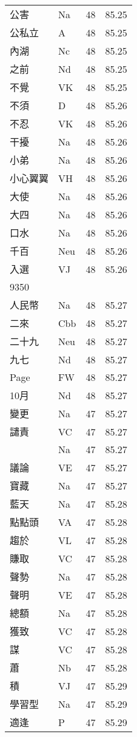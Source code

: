 \documentclass[twocolumn]{book}
\begin{document}
\begin{supertabular}{llrr}
公害 & Na & 48 &  85.25\\
公私立 & A & 48 &  85.25\\
內湖 & Nc & 48 &  85.25\\
之前 & Nd & 48 &  85.25\\
不覺 & VK & 48 &  85.25\\
不須 & D & 48 &  85.26\\
不忍 & VK & 48 &  85.26\\
干擾 & Na & 48 &  85.26\\
小弟 & Na & 48 &  85.26\\
小心翼翼 & VH & 48 &  85.26\\
大使 & Na & 48 &  85.26\\
大四 & Na & 48 &  85.26\\
口水 & Na & 48 &  85.26\\
千百 & Neu & 48 &  85.26\\
入選 & VJ & 48 &  85.26\\
9350\\
人民幣 & Na & 48 &  85.27\\
二來 & Cbb & 48 &  85.27\\
二十九 & Neu & 48 &  85.27\\
九七 & Nd & 48 &  85.27\\
Page & FW & 48 &  85.27\\
10月 & Nd & 48 &  85.27\\
變更 & Na & 47 &  85.27\\
譴責 & VC & 47 &  85.27\\
 & Na & 47 &  85.27\\
議論 & VE & 47 &  85.27\\
寶藏 & Na & 47 &  85.27\\
藍天 & Na & 47 &  85.28\\
點點頭 & VA & 47 &  85.28\\
趨於 & VL & 47 &  85.28\\
賺取 & VC & 47 &  85.28\\
聲勢 & Na & 47 &  85.28\\
聲明 & VE & 47 &  85.28\\
總額 & Na & 47 &  85.28\\
獲致 & VC & 47 &  85.28\\
謀 & VC & 47 &  85.28\\
蕭 & Nb & 47 &  85.28\\
積 & VJ & 47 &  85.29\\
學習型 & Na & 47 &  85.29\\
適逢 & P & 47 &  85.29\\

\end{supertabular}
\end{document}
